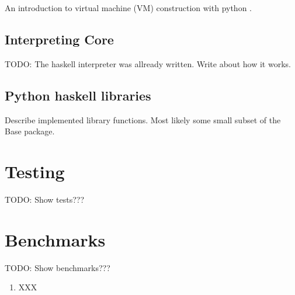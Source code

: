 \documentclass{article}
\begin{document}
An introduction to virtual machine (VM) construction with python \cite{pypy}.


\subsection{Interpreting Core}

TODO: The haskell interpreter was allready written. Write about how it works.

\subsection{Python haskell libraries}

Describe implemented library functions. Most likely some small subset of the Base package.

\section{Testing}

TODO: Show tests???

\section{Benchmarks}

TODO: Show benchmarks???





\begin{enumerate}
\item XXX
\end{enumerate}
\end{document}
